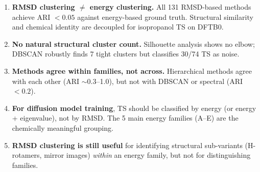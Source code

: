 \documentclass[11pt]{article}
\begin{document}
\begin{enumerate}
  \item \textbf{RMSD clustering $\neq$ energy clustering.} All 131 RMSD-based methods achieve ARI $< 0.05$
    against energy-based ground truth. Structural similarity and chemical identity are decoupled for
    isopropanol TS on DFTB0.

  \item \textbf{No natural structural cluster count.} Silhouette analysis shows no elbow; DBSCAN
    robustly finds 7 tight clusters but classifies 30/74 TS as noise.

  \item \textbf{Methods agree within families, not across.} Hierarchical methods agree with each other
    (ARI $\sim 0.3$--1.0), but not with DBSCAN or spectral (ARI $< 0.2$).

  \item \textbf{For diffusion model training}, TS should be classified by energy (or energy + eigenvalue),
    not by RMSD. The 5 main energy families (A--E) are the chemically meaningful grouping.

  \item \textbf{RMSD clustering is still useful} for identifying structural sub-variants (H-rotamers,
    mirror images) \emph{within} an energy family, but not for distinguishing families.
\end{enumerate}
\end{document}
